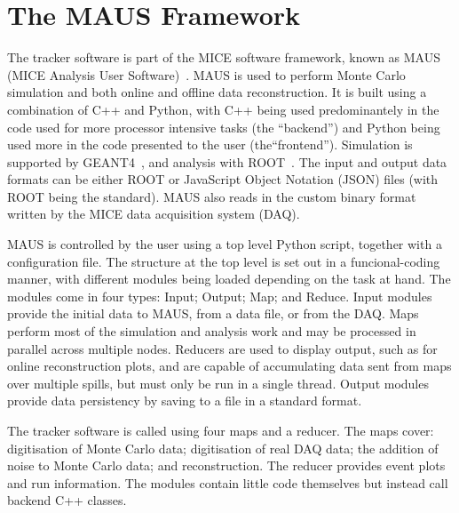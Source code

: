 \section{The MAUS Framework}
\label{sec:MAUS}
The tracker software is part of the MICE software framework, known as MAUS (MICE Analysis User Software)~\cite{MausPaper}. MAUS is used to perform Monte Carlo simulation and both online and offline data reconstruction. It is built using a combination of C++ and Python, with C++ being used predominantely in the code used for more processor intensive tasks (the ``backend'') and Python being used more in the code presented to the user (the``frontend'').  Simulation is supported by GEANT4~\cite{GEANT4}, and analysis with ROOT~\cite{ROOT}.  The input and output data formats can be either ROOT or JavaScript Object Notation (JSON) files (with ROOT being the standard). MAUS also reads in the custom binary format written by the MICE data acquisition system (DAQ). 

MAUS is controlled by the user using a top level Python script, together with a configuration file.  The structure at the top level is set out in a funcional-coding manner, with different modules being loaded depending on the task at hand.  The modules come in four types: Input; Output; Map; and Reduce.  Input modules provide the initial data to MAUS, from a data file, or from the DAQ. Maps perform most of the simulation and analysis work and may be processed in parallel across multiple nodes.  Reducers are used to display output, such as for online reconstruction plots, and are capable of accumulating data sent from maps over multiple spills, but must only be run in a single thread. Output modules provide data persistency by saving to a file in a standard format.

The tracker software is called using four maps and a reducer. The maps cover: digitisation of Monte Carlo data; digitisation of real DAQ data; the addition of noise to Monte Carlo data; and reconstruction. The reducer provides event plots and run information.  The modules contain little code themselves but instead call backend C++ classes.